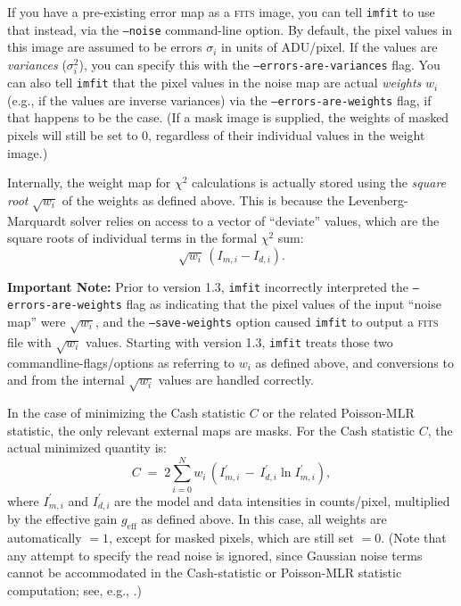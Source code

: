 \documentclass[10pt,a4paper,article]{memoir}
\newcommand{\imfitprog}{\texttt{imfit}}
\newcommand{\chisquare}{\ensuremath{\chi^{2}}}
\begin{document}
If you have a pre-existing error map as a \textsc{fits} image, you can tell \imfitprog{} to
use that instead, via the \texttt{--noise} command-line option. By default, the
pixel values in this image are assumed to be errors $\sigma_{i}$ in units of
ADU/pixel. If the values are \textit{variances} ($\sigma_{i}^2$), you can specify
this with the \texttt{--errors-are-variances} flag. You can also tell \imfitprog{}
that the pixel values in the noise map are actual \textit{weights} $w_{i}$ (e.g.,
if the values are inverse variances) via the
\texttt{--errors-are-weights} flag, if that happens to be the case. (If a mask
image is supplied, the weights of masked pixels will still be set to 0,
regardless of their individual values in the weight image.)

Internally, the weight map for \chisquare{} calculations is actually stored using
the \textit{square root} $\sqrt{w_{i}}$ of the weights as defined above. This is because the
Levenberg-Marquardt solver relies on access to a vector of ``deviate'' values, which are
the square roots of individual terms in the formal \chisquare{} sum:
\begin{equation}
\sqrt{w_{i}} \, (I_{m, i} - I_{d, i}) .
\end{equation}

\textbf{Important Note:} Prior to version 1.3, \imfitprog{} incorrectly
interpreted the \texttt{--errors-are-weights} flag as indicating that
the pixel values of the input ``noise map'' were $\sqrt{w_{i}}$, and the
\texttt{--save-weights} option caused \imfitprog{} to output a \textsc{fits} file with
$\sqrt{w_{i}}$ values. Starting with version 1.3, \imfitprog{} treats those two
commandline-flags/options as referring to $w_{i}$ as defined above, and
conversions to and from the internal $\sqrt{w_{i}}$ values are handled
correctly.

\bigskip

In the case of minimizing the Cash statistic $C$ or the related Poisson-MLR statistic, the 
only relevant external maps are masks. For the Cash statistic $C$, the actual minimized 
quantity is:
\begin{equation}
C \; = \; 2 \sum_{i = 0}^{N} w_{i} \, (I^{\prime}_{m, i} \, - \, I^{\prime}_{d, i} \ln I^{\prime}_{m, i}),
\end{equation}
where $I^{\prime}_{m, i}$ and $I^{\prime}_{d, i}$ are the model and data
intensities in counts/pixel, multiplied by the effective gain $g_{\mathrm{eff}}$ as defined 
above.  In this case, all weights are automatically $=1$, except for masked pixels, which 
are still set $= 0$. (Note that any attempt to specify the read noise is ignored, since 
Gaussian noise terms cannot be accommodated in the Cash-statistic or Poisson-MLR statistic
computation; see, e.g., \citealt{erwin15}.)
\end{document}

